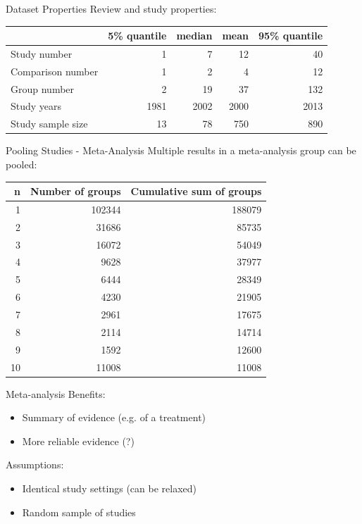 \documentclass[english]{beamer}\usepackage[]{graphicx}\usepackage[]{color}
\begin{document}
\begin{frame}[fragile]{Dataset Properties}
Review and study properties:
\begin{table}[ht]
\centering
\begingroup\footnotesize
\begin{tabular}{lrrrr}
  & 5\% quantile & median & mean & 95\% quantile \\ 
  \hline
Study number & 1 & 7 & 12 & 40 \\ 
   \hline
\hline
Comparison number & 1 & 2 & 4 & 12 \\ 
  Group number & 2 & 19 & 37 & 132 \\ 
  Study years & 1981 & 2002 & 2000 & 2013 \\ 
   \hline
Study sample size & 13 & 78 & 750 & 890 \\ 
  \end{tabular}
\endgroup
\end{table}

\end{frame}


\begin{frame}[fragile]{Pooling Studies - Meta-Analysis}
Multiple results in a meta-analysis group can be pooled:
\begin{table}[ht]
\centering
\begingroup\footnotesize
\begin{tabular}{rrr}
  \hline
n & Number of groups & Cumulative sum of groups \\ 
  \hline
1 & 102344 & 188079 \\ 
  2 & 31686 & 85735 \\ 
  3 & 16072 & 54049 \\ 
  4 & 9628 & 37977 \\ 
  5 & 6444 & 28349 \\ 
  6 & 4230 & 21905 \\ 
  7 & 2961 & 17675 \\ 
  8 & 2114 & 14714 \\ 
  9 & 1592 & 12600 \\ 
  10 & 11008 & 11008 \\ 
   \hline
\end{tabular}
\endgroup
\label{repr.groups}
\end{table}

\end{frame}

\begin{frame}{Meta-analysis}
Benefits:
\begin{itemize}
\item Summary of evidence (e.g. of a treatment)
\item More reliable evidence (?)
\end{itemize}

Assumptions:
\begin{itemize}
\item Identical study settings (can be relaxed)
\item Random sample of studies
\end{itemize}
\end{frame}
\end{document}
